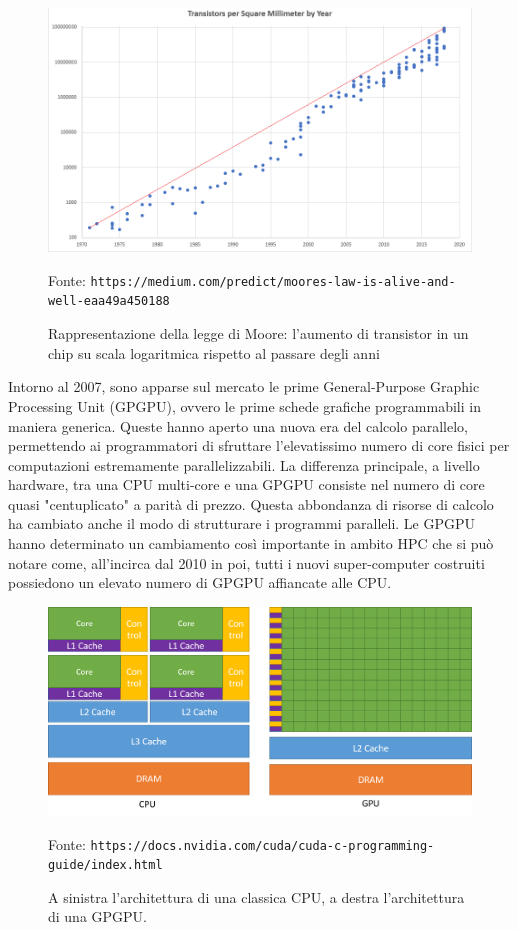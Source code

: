 \documentclass[12pt,a4paper]{book}
\newcommand{\source}[1]{\caption*{Fonte: {\small\texttt{#1}}} }
\begin{document}
	\begin{figure}[!ht]
		\centering
		\includegraphics[width=0.7\linewidth]{Moores_Law}
		\caption[Legge di Moore]{Rappresentazione della legge di Moore: l'aumento di transistor in un chip su scala logaritmica rispetto al passare degli anni}
		\source{https://medium.com/predict/moores-law-is-alive-and-well-eaa49a450188}
		\label{fig:mooreslaw}
	\end{figure}
	
	Intorno al 2007, sono apparse sul mercato le prime General-Purpose Graphic Processing Unit (GPGPU), ovvero le prime schede grafiche programmabili in maniera generica. Queste hanno aperto una nuova era del calcolo parallelo, permettendo ai programmatori di sfruttare l'elevatissimo numero di core fisici per computazioni estremamente parallelizzabili. La differenza principale, a livello hardware, tra una CPU multi-core e una GPGPU consiste nel numero di core quasi "centuplicato" a parità di prezzo. Questa abbondanza di risorse di calcolo ha cambiato anche il modo di strutturare i programmi paralleli. Le GPGPU hanno determinato un cambiamento così importante in ambito HPC che si può notare come, all'incirca dal 2010 in poi, tutti i nuovi super-computer costruiti possiedono un elevato numero di GPGPU affiancate alle CPU.
	
	\begin{figure}[!ht]
		\centering
		\includegraphics[width=0.7\linewidth]{cpu-gpu-computing-architecture}
		\caption[Differenza architetturale tra CPU e GPU]{A sinistra l'architettura di una classica CPU, a destra l'architettura di una GPGPU.}
		\source{https://docs.nvidia.com/cuda/cuda-c-programming-guide/index.html}
		\label{fig:cpu-gpu-computing-architecture}
	\end{figure}
	
\end{document}
